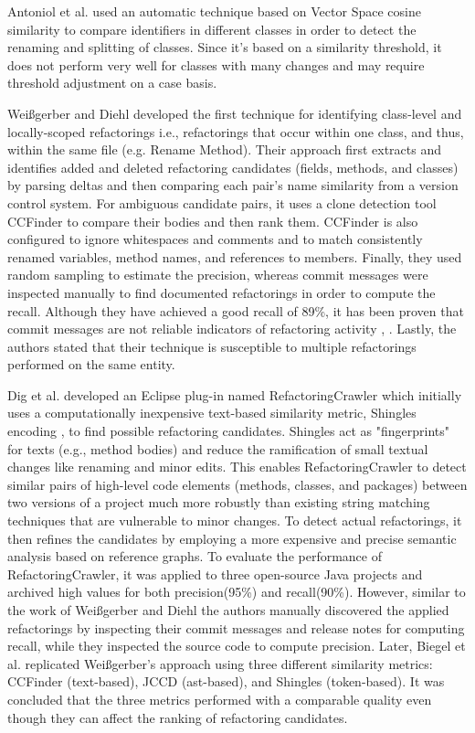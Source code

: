 \documentclass[letterpaper,12pt,onecolumn,final]{report}
\begin{document}
Antoniol et al. \cite{Antoniol2004} used an automatic technique based on Vector Space cosine similarity to compare identifiers in different classes in order to detect the renaming and splitting of classes. Since it's based on a similarity threshold, it does not perform very well for classes with many changes and may require threshold adjustment on a case basis.

Weißgerber and Diehl \cite{Weissgerber2006} developed the first technique for identifying class-level and locally-scoped refactorings i.e., refactorings that occur within one class, and thus, within the same file (e.g. Rename Method). Their approach first extracts and identifies added and deleted refactoring candidates (fields, methods, and classes) by parsing deltas and then comparing each pair's name similarity from a version control system. For ambiguous candidate pairs, it uses a clone detection tool CCFinder \cite{Kamiya2002} to compare their bodies and then rank them. CCFinder is also configured to ignore whitespaces and comments and to match consistently renamed variables, method names, and references to members. Finally, they used random sampling to estimate the precision, whereas commit messages were inspected manually to find documented refactorings in order to compute the recall. Although they have achieved a good recall of 89\%, it has been proven that commit messages are not reliable indicators of refactoring activity \cite{Krasniqi2020}, \cite{MurphyHill2012}. Lastly, the authors stated that their technique is susceptible to multiple refactorings performed on the same entity.

Dig et al. \cite{Dig2006} developed an Eclipse plug-in named RefactoringCrawler which initially uses a computationally inexpensive text-based similarity metric, Shingles encoding \cite{Broder1997}, to find possible refactoring candidates. Shingles act as "fingerprints" for texts (e.g., method bodies) and reduce the ramification of small textual changes like renaming and minor edits. This enables RefactoringCrawler to detect similar pairs of high-level code elements (methods, classes, and packages) between two versions of a project much more robustly than existing string matching techniques that are vulnerable to minor changes. To detect actual refactorings, it then refines the candidates by employing a more expensive and precise semantic analysis based on reference graphs. To evaluate the performance of RefactoringCrawler, it was applied to three open-source Java projects and archived high values for both precision(95\%) and recall(90\%). However, similar to the work of Weißgerber and Diehl \cite{Weissgerber2006} the authors manually discovered the applied refactorings by inspecting their commit messages and release notes for computing recall, while they inspected the source code to compute precision. Later, Biegel et al. \cite{Biegel2011} replicated Weißgerber’s approach using three different similarity metrics: CCFinder (text-based), JCCD \cite{Biegel2010} (ast-based), and Shingles (token-based). It was concluded that the three metrics performed with a comparable quality even though they can affect the ranking of refactoring candidates.
\end{document}
